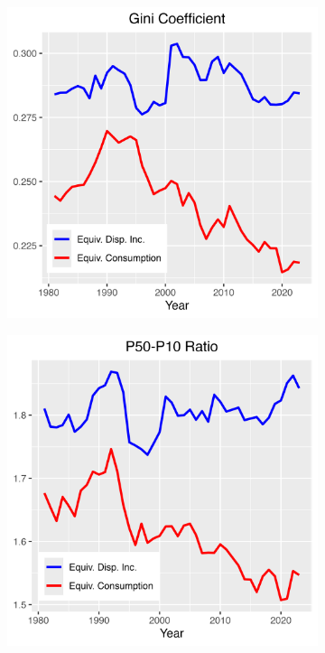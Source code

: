 \documentclass{article}
\begin{document}
\begin{figure}
\begin{subfigure}[t]{0.475\textwidth}
        \includegraphics[width=\textwidth]{figures/Fig_6/Fig_6b.png}
        \label{fig:Consumption_Gini}
    \end{subfigure}
    \begin{subfigure}[t]{0.475\textwidth}
        \centering
        \includegraphics[width=\textwidth]{figures/Fig_6/Fig_6c.png}

\end{subfigure}
\end{figure}
\end{document}
